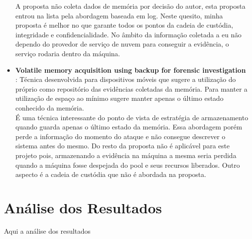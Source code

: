 \documentclass[
	12pt,				%
	openright,			%
	oneside,			%
	a4paper,			%
	english,			%
	french,				%
	spanish,			%
	brazil,				%
	]{abntex2}
\begin{document}
\begin{itemize}
A proposta não coleta dados de memória por decisão do autor, esta proposta entrou na lista pela abordagem baseada em log. Neste quesito, minha proposta é melhor no que 
garante todos os pontos da cadeia de custódia, integridade e confidencialidade. No âmbito da informação coletada a eu não dependo do provedor de serviço de nuvem para 
conseguir a evidência, o serviço rodaria dentro da máquina. \\

\item \textbf{Volatile memory acquisition using backup for forensic investigation \cite{Dezfouli2012} }: Técnica desenvolvida para dispositivos móveis que sugere a utilização
do próprio como repositório das evidências coletadas da memória. Para manter a utilização de espaço ao mínimo sugere manter apenas o último estado conhecido da memória.\\
 
É uma técnica interessante do ponto de vista de estratégia de armazenamento quando guarda apenas o último estado da memória. Essa abordagem porém perde a informação do momento 
do ataque e não consegue descrever o sistema antes do mesmo. Do resto da proposta não é aplicável para este projeto pois, armazenando a evidência na máquina a mesma seria perdida
quando a máquina fosse despejada do pool e seus recursos liberados. Outro aspecto é a cadeia de custódia que não é abordada na proposta.
 
 \end{itemize}
 
\chapter{Análise dos Resultados}

Aqui a análise dos resultados


\postextual





\printindex
\end{document}
